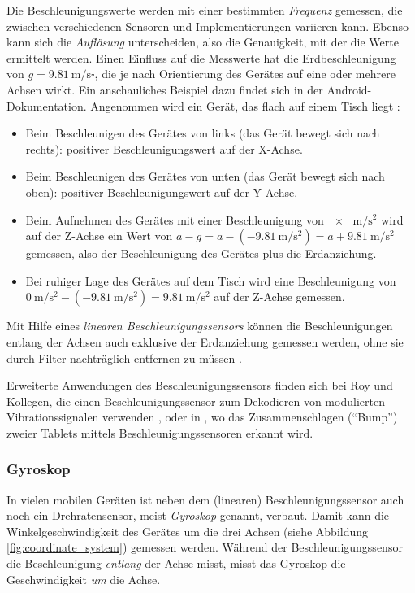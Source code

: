 Die Beschleunigungswerte werden mit einer bestimmten \textit{Frequenz} gemessen, die zwischen verschiedenen Sensoren und Implementierungen variieren kann. Ebenso kann sich die \textit{Auflösung} unterscheiden, also die Genauigkeit, mit der die Werte ermittelt werden. Einen Einfluss auf die Messwerte hat die Erdbeschleunigung von \(g=\SI{9.81}{\meter\per\second\square}\), die je nach Orientierung des Gerätes auf eine oder mehrere Achsen wirkt. Ein anschauliches Beispiel dazu findet sich in der Android-Dokumentation. Angenommen wird ein Gerät, das flach auf einem Tisch liegt \citep{AndroidSensors}:
\begin{itemize}
\item Beim Beschleunigen des Gerätes von links (das Gerät bewegt sich nach rechts): positiver Beschleunigungswert auf der X-Achse.
\item Beim Beschleunigen des Gerätes von unten (das Gerät bewegt sich nach oben): positiver Beschleunigungswert auf der Y-Achse.
\item Beim Aufnehmen des Gerätes mit einer Beschleunigung von \(\SI[parse-numbers = false]{x}{\meter\per\square\second}\) wird auf der Z-Achse ein Wert von \(a - g = a - (\SI{-9.81}{\meter\per\square\second}) = a + \SI{9.81}{\meter\per\square\second}\) gemessen, also der Beschleunigung des Gerätes plus die Erdanziehung.
\item Bei ruhiger Lage des Gerätes auf dem Tisch wird eine Beschleunigung von \(\SI{0}{\meter\per\square\second} - (\SI{-9.81}{\meter\per\square\second}) = \SI{9.81}{\meter\per\square\second}\) auf der Z-Achse gemessen.
\end{itemize}

Mit Hilfe eines \textit{linearen Beschleunigungssensors} können die Beschleunigungen entlang der Achsen auch exklusive der Erdanziehung gemessen werden, ohne sie durch Filter nachträglich entfernen zu müssen \citep{AndroidMotionSensors}.

Erweiterte Anwendungen des Beschleunigungssensors finden sich bei Roy und Kollegen, die einen Beschleunigungssensor zum Dekodieren von modulierten Vibrationssignalen verwenden \citep{Nirupam2015}, oder in \citep{Hinckley2004}, wo das Zusammenschlagen ("`Bump"') zweier Tablets mittels Beschleunigungssensoren erkannt wird.

\subsubsection{Gyroskop}
In vielen mobilen Geräten ist neben dem (linearen) Beschleunigungssensor auch noch ein Drehratensensor, meist \textit{Gyroskop} genannt, verbaut. Damit kann die Winkelgeschwindigkeit des Gerätes um die drei Achsen (siehe Abbildung \ref{fig:coordinate_system}) gemessen werden. Während der Beschleunigungssensor die Beschleunigung \textit{entlang} der Achse misst, misst das Gyroskop die Geschwindigkeit \textit{um} die Achse. 

